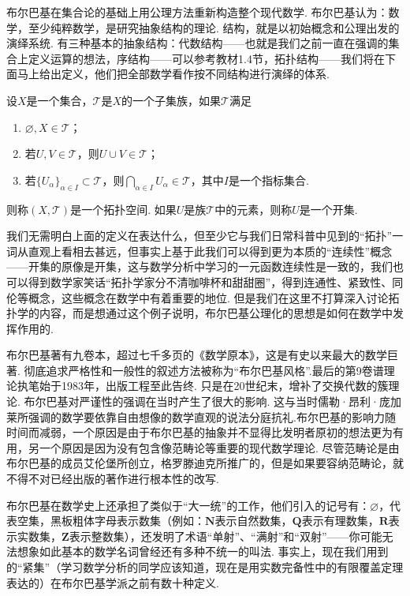 布尔巴基在集合论的基础上用公理方法重新构造整个现代数学. 布尔巴基认为：数学，至少纯粹数学，是研究抽象结构的理论. 结构，就是以初始概念和公理出发的演绎系统. 有三种基本的抽象结构：代数结构——也就是我们之前一直在强调的集合上定义运算的想法，序结构——可以参考教材1.4节，拓扑结构——我们将在下面马上给出定义，他们把全部数学看作按不同结构进行演绎的体系.

\begin{definition*}
    设$X$是一个集合，$\mathscr{T}$是$X$的一个子集族，如果$\mathscr{T}$满足
    \begin{enumerate}
        \item $\varnothing,X\in \mathscr{T}$；
        \item 若$U,V\in \mathscr{T}$，则$U\cup V\in \mathscr{T}$；
        \item 若$\{U_\alpha\}_{\alpha\in I}\subset \mathscr{T}$，则$\bigcap_{\alpha\in I}U_\alpha\in \mathscr{T}$，其中$I$是一个指标集合.
    \end{enumerate}
    则称$(X,\mathscr{T})$是一个拓扑空间. 如果$U$是族$\mathscr{T}$中的元素，则称$U$是一个开集.
\end{definition*}

我们无需明白上面的定义在表达什么，但至少它与我们日常科普中见到的``拓扑''一词从直观上看相去甚远，但事实上基于此我们可以得到更为本质的``连续性''概念——开集的原像是开集，这与数学分析中学习的一元函数连续性是一致的，我们也可以得到数学家笑话``拓扑学家分不清咖啡杯和甜甜圈''，得到连通性、紧致性、同伦等概念，这些概念在数学中有着重要的地位. 但是我们在这里不打算深入讨论拓扑学的内容，而是想通过这个例子说明，布尔巴基公理化的思想是如何在数学中发挥作用的.

布尔巴基著有九卷本，超过七千多页的《数学原本》，这是有史以来最大的数学巨著. 彻底追求严格性和一般性的叙述方法被称为``布尔巴基风格''.最后的第9卷谱理论执笔始于1983年，出版工程至此告终. 只是在20世纪末，增补了交换代数的簇理论. 布尔巴基对严谨性的强调在当时产生了很大的影响. 这与当时儒勒·昂利·庞加莱所强调的数学要依靠自由想像的数学直观的说法分庭抗礼.布尔巴基的影响力随时间而减弱，一个原因是由于布尔巴基的抽象并不显得比发明者原初的想法更为有用，另一个原因是因为没有包含像范畴论等重要的现代数学理论. 尽管范畴论是由布尔巴基的成员艾伦堡所创立，格罗滕迪克所推广的，但是如果要容纳范畴论，就不得不对已经出版的著作进行根本性的改写.

布尔巴基在数学史上还承担了类似于``大一统''的工作，他们引入的记号有：$\varnothing$，代表空集，黑板粗体字母表示数集（例如：$\mathbf{N}$表示自然数集，$\mathbf{Q}$表示有理数集，$\mathbf{R}$表示实数集，$\mathbf{Z}$表示整数集），还发明了术语``单射''、``满射''和``双射''——你可能无法想象如此基本的数学名词曾经还有多种不统一的叫法. 事实上，现在我们用到的``紧集''（学习数学分析的同学应该知道，现在是用实数完备性中的有限覆盖定理表达的）在布尔巴基学派之前有数十种定义.

